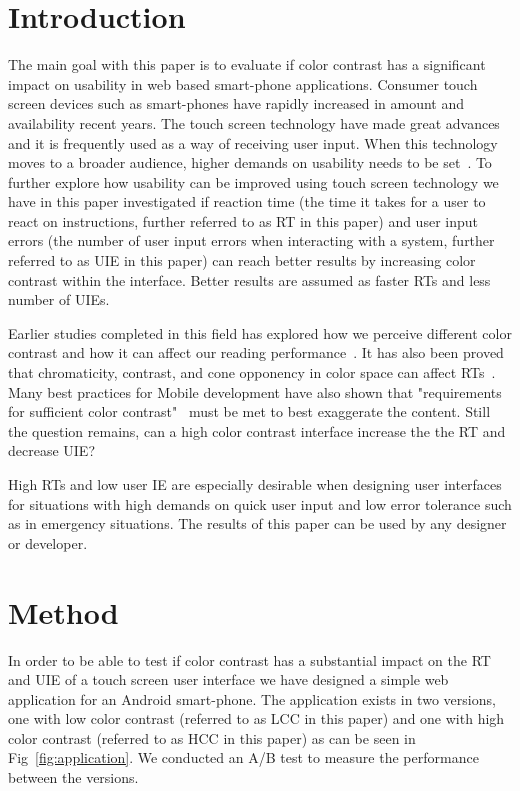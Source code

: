 \documentclass[runningheads,a4paper]{llncs}
\begin{document}
\section{Introduction}
The main goal with this paper is to evaluate if color contrast has a significant impact on usability in web based smart-phone applications. Consumer touch screen devices such as smart-phones have rapidly increased in amount and availability recent years. The touch screen technology have made great advances~\cite{jennings2013touch} and it is frequently used as a way of receiving user input. When this technology moves to a broader audience, higher demands on usability needs to be set~\cite{gong2004guidelines}. To further explore how usability can be improved using touch screen technology we have in this paper investigated if reaction time (the time it takes for a user to react on instructions, further referred to as RT in this paper) and user input errors (the number of user input errors when interacting with a system, further referred to as UIE in this paper) can reach better results by increasing color contrast within the interface. Better results are assumed as faster RTs and less number of UIEs. 

Earlier studies completed in this field has explored how we perceive different color contrast and how it can affect our reading performance~\cite{wu2003improving}. It has also been proved that chromaticity, contrast, and cone opponency in color space can affect RTs~\cite{mckeefry2003simple}. Many best practices for Mobile development have also shown that "requirements for sufficient color contrast"~\cite{marcus2013design} must be met to best exaggerate the content. Still the question remains, can a high color contrast interface increase the the RT and decrease UIE?

High RTs and low user IE are especially desirable when designing user interfaces for situations with high demands on quick user input and low error tolerance such as in emergency situations. The results of this paper can be used by any designer or developer.

\section{Method}
In order to be able to test if color contrast has a substantial impact on the RT and UIE of a touch screen user interface we have designed a simple web application for an Android smart-phone. The application exists in two versions, one with low color contrast (referred to as LCC in this paper) and one with high color contrast (referred to as HCC in this paper) as can be seen in Fig~\ref{fig:application}. We conducted an A/B test to measure the performance between the versions.
\end{document}
